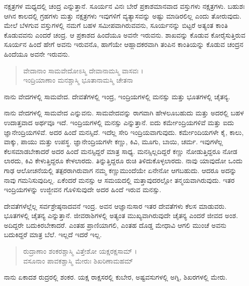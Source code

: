 ನಕ್ಷತ್ರಗಳ ಮಧ್ಯದಲ್ಲಿ ಚಂದ್ರ ಎನ್ನುತ್ತಾನೆ. ಸೂರ್ಯನ ವಿನಃ ಬೇರೆ ಪ್ರಕಾಶಮಾನವಾದ ವಸ್ತುಗಳು ನಕ್ಷತ್ರಗಳು. ಬಹುಶಃ ಆಗಿನ ಕಾಲದಲ್ಲಿ ಗ್ರಹಗಳು ಮತ್ತು ನಕ್ಷತ್ರಗಳು ಇವುಗಳಿಗೆ ವ್ಯತ್ಯಾಸವನ್ನು ಅಷ್ಟು ಮಾಡಿರಲಿಲ್ಲ ಎಂದು ತೋರುವುದು. ಮೇಲೆ ಬೆಳಗುವ ವಸ್ತುಗಳಲ್ಲಿ ನಮಗೆ ಬಹಳ ಸಮೀಪವಾಗಿರುವವನು, ಸೂರ್ಯನನ್ನು ಬಿಟ್ಟರೆ ಅತ್ಯಂತ ಕಾಂತಿ ಕೊಡುವವನು ಎಂದರೆ ಚಂದ್ರ. ಆ ಪ್ರಕಾಶದ ಹಿಂದೆಯೂ ಅವನೇ ಇರುವನು. ಶಾಖವನ್ನು ಕೊಡುವ ಕೋರೈಸುತ್ತಿರುವ ಸೂರ್ಯನ ಹಿಂದೆ ಹೇಗೆ ಅವನು ಇರುವನೊ, ಹಾಗೆಯೇ ಆಹ್ಲಾದಕರವಾಗಿ ತಂಪಿನ ಕಾಂತಿಯನ್ನು ಕೊಡುವ ಚಂದ್ರನ ಹಿಂದೆಯೂ ಅವನೇ ಇರುವನು.

\begin{verse}
ವೇದಾನಾಂ ಸಾಮವೇದೋಽಸ್ಮಿ ದೇವಾನಾಮಸ್ಮಿ ವಾಸವಃ ।\\ಇಂದ್ರಿಯಾಣಾಂ ಮನಶ್ಚಾಸ್ಮಿ ಭೂತಾನಾಮಸ್ಮಿ ಚೇತನಾ 
\end{verse}

{\small ನಾನು ವೇದಗಳಲ್ಲಿ ಸಾಮವೇದ. ದೇವತೆಗಳಲ್ಲಿ ಇಂದ್ರ, ಇಂದ್ರಿಯಗಳಲ್ಲಿ ಮನಸ್ಸು ಮತ್ತು ಭೂತಗಳಲ್ಲಿ ಚೈತನ್ಯ.}

ನಾನು ವೇದಗಳಲ್ಲಿ ಸಾಮವೇದ ಎನ್ನುವನು. ಸಾಮವೇದವನ್ನು ರಾಗವಾಗಿ ಹೇಳಲೂಬಹುದು ಮತ್ತು ಅದರಲ್ಲಿ ಬಹಳ ಉದಾತ್ತವಾದ ಅರ್ಥವೂ ಇದೆ. ಇಂದ್ರಿಯಗಳಲ್ಲಿ ಮನಸ್ಸು ಎನ್ನುತ್ತಾನೆ. ಐದು ಕರ್ಮೇಂದ್ರಿಯಗಳಿವೆ ಮತ್ತು ಐದು ಜ್ಞಾನೇಂದ್ರಿಯಗಳಿವೆ. ಅದರ ಹಿಂದೆ ಮನಸ್ಸಿದೆ. ಇದೆಲ್ಲ ಸೇರಿ ಇಂದ್ರಿಯವಾಗುವುದು. ಕರ್ಮೇಂದಿಯಗಳೇ ಕೈ, ಕಾಲು, ವಾಕ್ಕು, ಪಾಯು ಮತ್ತು ಉಪಸ್ಥ. ಜ್ಞಾನೇಂದ್ರಿಯಗಳೇ ಕಣ್ಣು, ಕಿವಿ, ಮೂಗು, ಬಾಯಿ, ಚರ್ಮ. ಇವುಗಳೆಲ್ಲ ಕೆಲಸಮಾಡಬೇಕಾದರೆ ಅದರ ಹಿಂದೆ ಮನಸ್ಸಿದ್ದರೆ ಮಾತ್ರ ಸಾಧ್ಯ. ಮನಸ್ಸಿಲ್ಲದಿದ್ದರೆ ಕಣ್ಣು ನೋಡುತ್ತಿದ್ದರೂ ನೋಡ ಲಾರದು, ಕಿವಿ ಕೇಳುತ್ತಿದ್ದರೂ ಕೇಳಲಾರದು. ತಿನ್ನುತ್ತಿದ್ದರೂ ರುಚಿ ತಿಳಿದುಕೊಳ್ಳಲಾರದು. ನಾವು ಯಾವುದೋ ಒಂದು ಗಾಢ ಆಲೋಚನೆಯಲ್ಲಿ ತತ್ಪರರಾಗಿರುವಾಗ ನಮ್ಮ ಕಣ್ಣುಮುಂದೆಯೇ ಏನೇನೋ ಆಗಬಹುದು. ಆದರೂ ಅದನ್ನು ನಾವು ಗಮನಿಸುವುದಿಲ್ಲ. ಏಕೆಂದರೆ ಮನಸ್ಸು ಆ ಸಮಯದಲ್ಲಿ ಮತ್ತಾವುದರಲ್ಲೋ ತನ್ಮಯವಾಗಿರುವುದು. ಇತರ ಇಂದ್ರಿಯಗಳನ್ನು ಉಜ್ಜೀವನ ಗೊಳಿಸುವುದೇ ಅದರ ಹಿಂದೆ ಇರುವ ಮನಸ್ಸು.

ದೇವತೆಗಳೆಲ್ಲೆಲ್ಲ ಸರ್ವಶ್ರೇಷ್ಠನಾದವನೆ ಇಂದ್ರ. ಅವನ ಆಜ್ಞಾನುಸಾರ ಇತರ ದೇವತೆಗಳು ಕೆಲಸ ಮಾಡುವರು. ಭೂತಗಳಲ್ಲಿ ಚೈತನ್ಯ ಎನ್ನುತ್ತಾನೆ. ಜೀವರಾಶಿಗಳಲ್ಲಿ ಅತ್ಯಂತ ಮುಖ್ಯವಾಗಿರುವುದೇ ಚೈತನ್ಯ ಎಂದರೆ ಜೀವದ ಅಂಶ. ಅದಿದ್ದರೇ ಬದುಕಿರಬೇಕಾದರೆ. ಎಂತಹ ಪ್ರಾಣಿಯಾಗಲಿ, ಎಂತಹ ದೊಡ್ಡ ಮೇಧಾವಿ ಆಗಲಿ ಮುಂಚೆ ಅವನು ಬದುಕಿದ್ದರೆ ಮಾತ್ರ ಬೆಲೆ. ಇಲ್ಲದೆ ಇದರೆ ಇಲ್ಲ.

\begin{verse}
ರುದ್ರಾಣಾಂ ಶಂಕರಶ್ಚಾಸ್ಮಿ ವಿತ್ತೇಶೋ ಯಕ್ಷರಕ್ಷಸಾಮ್ ।\\ವಸೂನಾಂ ಪಾವಕಶ್ಚಾಸ್ಮಿ ಮೇರುಃ ಶಿಖರಿಣಾಮಹಮ್ 
\end{verse}

{\small ನಾನು ಏಕಾದಶ ರುದ್ರರಲ್ಲಿ ಶಂಕರ. ಯಕ್ಷ ರಾಕ್ಷಸರಲ್ಲಿ ಕುಬೇರ, ಅಷ್ಟವಸುಗಳಲ್ಲಿ ಅಗ್ನಿ, ಶಿಖರಗಳಲ್ಲಿ ಮೇರು.}

